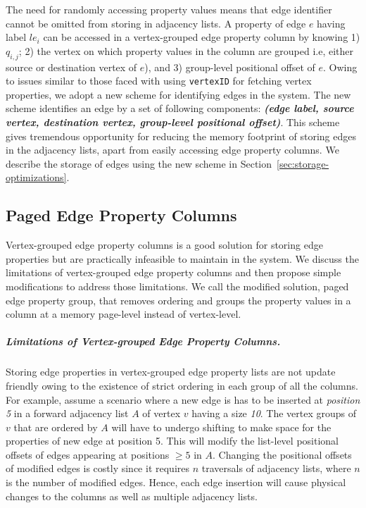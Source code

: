 The need for randomly accessing property values means that edge identifier cannot be omitted from storing in adjacency lists. A property of edge $e$ having label $le_i$ can be accessed in a vertex-grouped edge property column by knowing 1) $q_{i,j}$; 2) the vertex on which property values in the column are grouped i.e, either source or destination vertex of $e$), and 3) group-level positional offset of $e$. Owing to issues similar to those faced with using \texttt{vertexID} for fetching vertex properties, we adopt a new scheme for identifying edges in the system. The new scheme identifies an edge by a set of following components: \textbf{\emph{(edge label, source vertex, destination vertex, group-level positional offset)}}. This scheme gives tremendous opportunity for reducing the memory footprint of storing edges in the adjacency lists, apart from easily accessing edge property columns. We describe the storage of edges using the new scheme in Section~\ref{sec:storage-optimizations}.

\subsection{Paged Edge Property Columns}
\label{sec:paged-edge-property-columns}

Vertex-grouped edge property columns is a good solution for storing edge properties but are practically infeasible to maintain in the system. We discuss the limitations of vertex-grouped edge property columns and then propose simple modifications to address those limitations. We call the modified solution, paged edge property group, that removes ordering and groups the property values in a column at a memory page-level instead of vertex-level.

\vspace{-12pt}
\subparagraph{Limitations of Vertex-grouped Edge Property Columns.}
Storing edge properties in vertex-grouped edge property lists are not update friendly owing to the existence of strict ordering in each group of all the columns. For example, assume a scenario where a new edge is has to be inserted at \emph{position 5} in a forward adjacency list $A$ of vertex $v$ having a size \emph{10}. The vertex groups of $v$ that are ordered by $A$ will have to undergo shifting to make space for the properties of new edge at position 5. This will modify the list-level positional offsets of edges appearing at positions $\geq 5$ in $A$. Changing the positional offsets of modified edges is costly since it requires $n$ traversals of adjacency lists, where $n$ is the number of modified edges. Hence, each edge insertion will cause physical changes to the columns as well as multiple adjacency lists.

